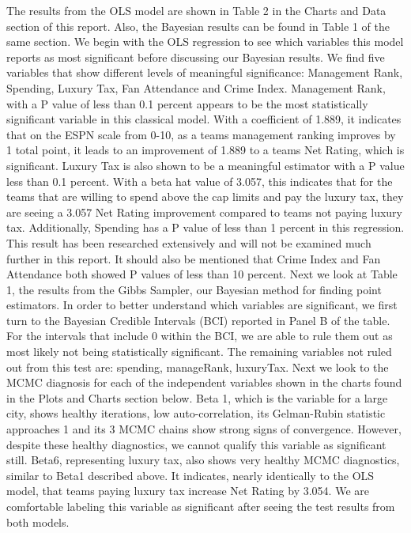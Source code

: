 \documentclass[12pt,english]{article}
\begin{document}
The results from the OLS model are shown in Table 2 in the Charts and Data section of this report. Also, the Bayesian results can be found in Table 1 of the same section. 
\newline
We begin with the OLS regression to see which variables this model reports as most significant before discussing our Bayesian results. We find five variables that show different levels of meaningful significance: Management Rank, Spending, Luxury Tax, Fan Attendance and Crime Index. Management Rank, with a P value of less than 0.1 percent appears to be the most statistically significant variable in this classical model. With a coefficient of 1.889, it indicates that on the ESPN scale from 0-10, as a teams management ranking improves by 1 total point, it leads to an improvement of 1.889 to a teams Net Rating, which is significant. Luxury Tax is also shown to be a meaningful estimator with a P value less than 0.1 percent. With a beta hat value of 3.057, this indicates that for the teams that are willing to spend above the cap limits and pay the luxury tax, they are seeing a 3.057 Net Rating improvement compared to teams not paying luxury tax. Additionally, Spending has a P value of less than 1 percent in this regression. This result has been researched extensively and will not be examined much further in this report. It should also be mentioned that Crime Index and Fan Attendance both showed P values of less than 10 percent. 
\newline
Next we look at Table 1, the results from the Gibbs Sampler, our Bayesian method for finding point estimators. In order to better understand which variables are significant, we first turn to the Bayesian Credible Intervals (BCI) reported in Panel B of the table. For the intervals that include 0 within the BCI, we are able to rule them out as most likely not being statistically significant. The remaining variables not ruled out from this test are: spending, manageRank, luxuryTax. 
\newline
Next we look to the MCMC diagnosis for each of the independent variables shown in the charts found in the Plots and Charts section below. Beta 1, which is the variable for a large city, shows healthy iterations, low auto-correlation, its Gelman-Rubin statistic approaches 1 and its 3 MCMC chains show strong signs of convergence. However, despite these healthy diagnostics, we cannot qualify this variable as significant still. 
\newline
Beta6, representing luxury tax, also shows very healthy MCMC diagnostics, similar to Beta1 described above. It indicates, nearly identically to the OLS model, that teams paying luxury tax increase Net Rating by 3.054. We are comfortable labeling this variable as significant after seeing the test results from both models. 
\end{document}
